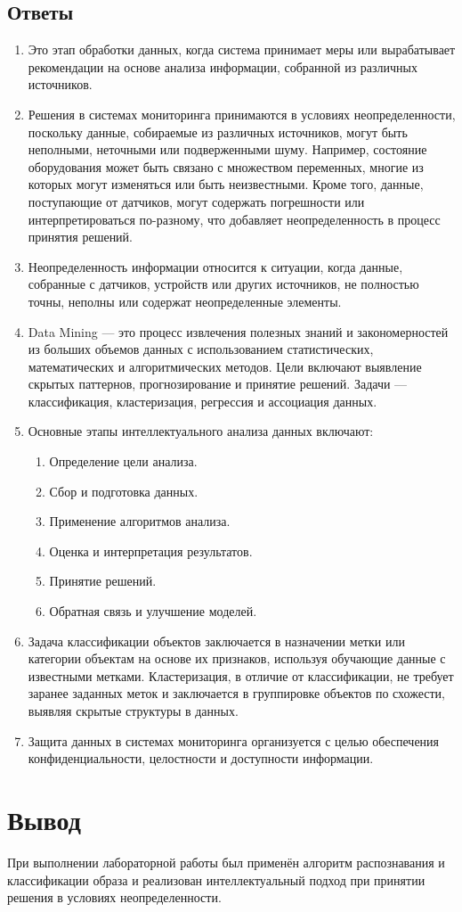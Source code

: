 \documentclass[a4paper, 12pt]{article}
\begin{document}
\subsection*{Ответы}
\begin{enumerate}
  \item Это этап обработки данных, когда система принимает меры или вырабатывает рекомендации на основе анализа информации, собранной из различных источников.
  \item Решения в системах мониторинга принимаются в условиях неопределенности, поскольку данные, собираемые из различных источников, могут быть неполными, неточными или подверженными шуму. Например, состояние оборудования может быть связано с множеством переменных, многие из которых могут изменяться или быть неизвестными. Кроме того, данные, поступающие от датчиков, могут содержать погрешности или интерпретироваться по-разному, что добавляет неопределенность в процесс принятия решений.
  \item Неопределенность информации относится к ситуации, когда данные, собранные с датчиков, устройств или других источников, не полностью точны, неполны или содержат неопределенные элементы.
  \item Data Mining — это процесс извлечения полезных знаний и закономерностей из больших объемов данных с использованием статистических, математических и алгоритмических методов. Цели включают выявление скрытых паттернов, прогнозирование и принятие решений. Задачи — классификация, кластеризация, регрессия и ассоциация данных.
  \item Основные этапы интеллектуального анализа данных включают:
    \begin{enumerate}
      \item Определение цели анализа.
      \item Сбор и подготовка данных.
      \item Применение алгоритмов анализа.
      \item Оценка и интерпретация результатов.
      \item Принятие решений.
      \item Обратная связь и улучшение моделей.
    \end{enumerate}
  \item Задача классификации объектов заключается в назначении метки или категории объектам на основе их признаков, используя обучающие данные с известными метками. Кластеризация, в отличие от классификации, не требует заранее заданных меток и заключается в группировке объектов по схожести, выявляя скрытые структуры в данных.
  \item Защита данных в системах мониторинга организуется с целью обеспечения конфиденциальности, целостности и доступности информации.
\end{enumerate}
\newpage
\section{Вывод}
При выполнении лабораторной работы был применён алгоритм распознавания и классификации образа и реализован интеллектуальный подход при принятии решения в условиях неопределенности.
\end{document}
